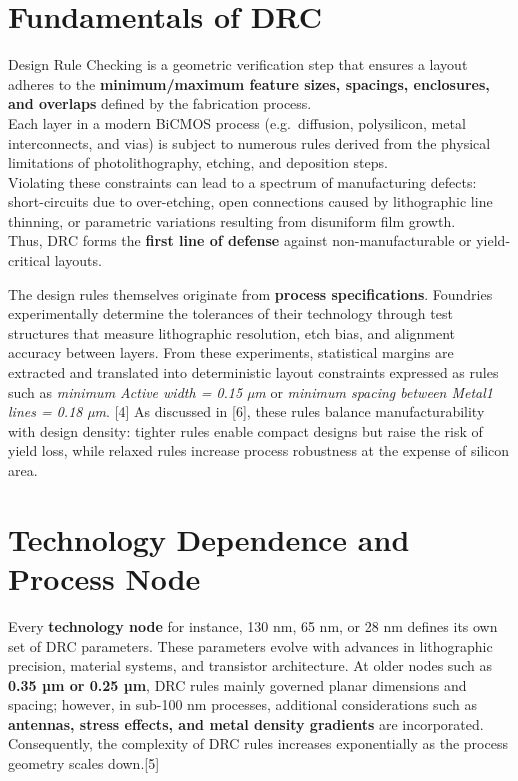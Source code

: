 \documentclass[
  11pt,
  a4paper,
  oneside]{scrbook}
\begin{document}
\section{Fundamentals of DRC}\label{fundamentals-of-drc}

Design Rule Checking is a geometric verification step that ensures a
layout adheres to the \textbf{minimum/maximum feature sizes, spacings,
enclosures, and overlaps} defined by the fabrication process.\\
Each layer in a modern BiCMOS process (e.g.~diffusion, polysilicon,
metal interconnects, and vias) is subject to numerous rules derived from
the physical limitations of photolithography, etching, and deposition
steps.\\
Violating these constraints can lead to a spectrum of manufacturing
defects: short-circuits due to over-etching, open connections caused by
lithographic line thinning, or parametric variations resulting from
disuniform film growth.\\
Thus, DRC forms the \textbf{first line of defense} against
non-manufacturable or yield-critical layouts.

The design rules themselves originate from \textbf{process
specifications}. Foundries experimentally determine the tolerances of
their technology through test structures that measure lithographic
resolution, etch bias, and alignment accuracy between layers. From these
experiments, statistical margins are extracted and translated into
deterministic layout constraints expressed as rules such as
\emph{minimum Active width = 0.15 µm} or \emph{minimum spacing between
Metal1 lines = 0.18 µm}. {[}4{]} As discussed in {[}6{]}, these rules
balance manufacturability with design density: tighter rules enable
compact designs but raise the risk of yield loss, while relaxed rules
increase process robustness at the expense of silicon area.

\section{Technology Dependence and Process
Node}\label{technology-dependence-and-process-node}

Every \textbf{technology node} for instance, 130 nm, 65 nm, or 28 nm
defines its own set of DRC parameters. These parameters evolve with
advances in lithographic precision, material systems, and transistor
architecture. At older nodes such as \textbf{0.35 µm or 0.25 µm}, DRC
rules mainly governed planar dimensions and spacing; however, in sub-100
nm processes, additional considerations such as \textbf{antennas, stress
effects, and metal density gradients} are incorporated. Consequently,
the complexity of DRC rules increases exponentially as the process
geometry scales down.{[}5{]}
\end{document}
